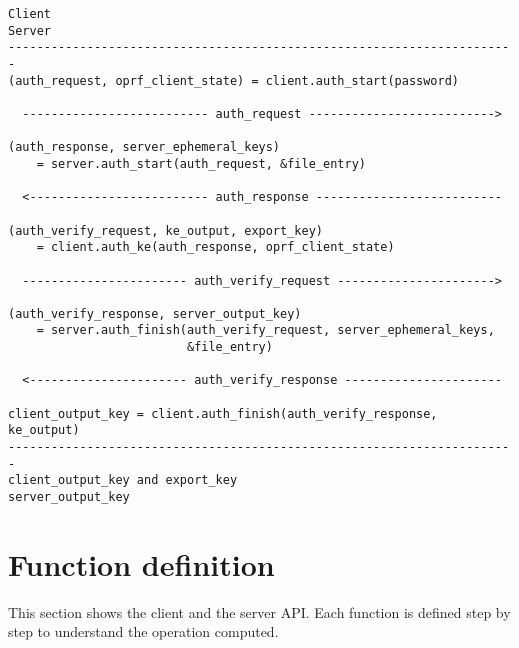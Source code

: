 ﻿\documentclass[../report.tex]{subfiles}
\begin{document}
\begin{verbatim}
Client                                                           Server
-----------------------------------------------------------------------
(auth_request, oprf_client_state) = client.auth_start(password)

  -------------------------- auth_request -------------------------->
  
(auth_response, server_ephemeral_keys) 
    = server.auth_start(auth_request, &file_entry)
    
  <------------------------- auth_response --------------------------
  
(auth_verify_request, ke_output, export_key) 
    = client.auth_ke(auth_response, oprf_client_state)
    
  ----------------------- auth_verify_request ---------------------->
  
(auth_verify_response, server_output_key) 
    = server.auth_finish(auth_verify_request, server_ephemeral_keys,
                         &file_entry)
                         
  <---------------------- auth_verify_response ----------------------
  
client_output_key = client.auth_finish(auth_verify_response, ke_output)
-----------------------------------------------------------------------
client_output_key and export_key                      server_output_key
\end{verbatim}


\section{Function definition} \label{sec:impl_function_def}
This section shows the client and the server API.
Each function is defined step by step to understand the operation computed.
\end{document}
